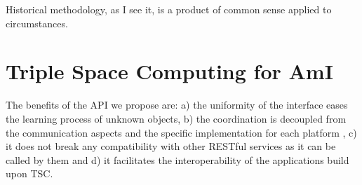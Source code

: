 

\begin{savequote}[50mm]
Historical methodology, as I see it, is a product of common sense applied to circumstances. 
\end{savequote}


\chapter{Triple Space Computing for AmI}
\label{cha:tsc}

\ifpdf
    \graphicspath{{3_overall_methodology/figures/PNG/}{3_overall_methodology/figures/PDF/}{3_overall_methodology/figures/}}
\else
    \graphicspath{{3_overall_methodology/figures/EPS/}{3_overall_methodology/figures/}}
\fi



The benefits of the API we propose are: a) the uniformity of the interface eases the learning process of unknown
objects, b) the coordination is decoupled from the communication aspects and the specific implementation for each
platform \cite{gelernter_generative_1985}, c) it does not break any compatibility with other RESTful services as it
can be called by them and d) it facilitates the interoperability of the applications build upon TSC.



